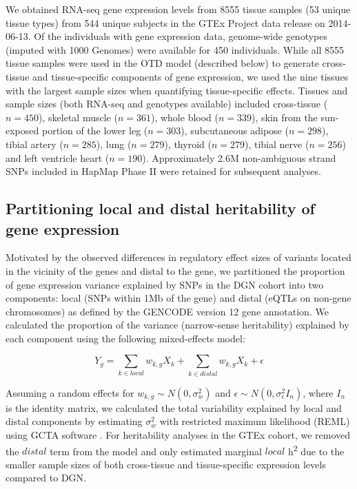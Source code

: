 \documentclass[10pt,letterpaper]{article}
\begin{document}
We obtained RNA-seq gene expression levels from 8555 tissue samples (53
unique tissue types) from 544 unique subjects in the GTEx Project \cite{Ardlie_2015} 
data release on 2014-06-13. Of the individuals with gene
expression data, genome-wide genotypes (imputed with 1000 Genomes) were
available for 450 individuals. While all 8555 tissue samples were used
in the OTD model (described below) to generate cross-tissue and
tissue-specific components of gene expression, we used the nine tissues
with the largest sample sizes when quantifying tissue-specific effects.
Tissues and sample sizes (both RNA-seq and genotypes available) included
cross-tissue (\(n=450\)), skeletal muscle (\(n=361\)), whole blood
(\(n=339\)), skin from the sun-exposed portion of the lower leg
(\(n=303\)), subcutaneous adipose (\(n=298\)), tibial artery
(\(n=285\)), lung (\(n=279\)), thyroid (\(n=279\)), tibial nerve
(\(n=256\)) and left ventricle heart (\(n=190\)). Approximately 2.6M
non-ambiguous strand SNPs included in HapMap Phase II were retained for
subsequent analyses.

\subsection*{Partitioning local and distal heritability of gene
expression}\label{partitioning-local-and-distal-heritability-of-gene-expression}

Motivated by the observed differences in regulatory effect sizes of variants located in the vicinity of the genes and distal to the gene,
we partitioned the proportion of gene expression variance explained by
SNPs in the DGN cohort into two components: local (SNPs within 1Mb of
the gene) and distal (eQTLs on non-gene chromosomes) as defined by the
GENCODE \cite{Harrow_2012} version 12 gene annotation. We calculated the
proportion of the variance (narrow-sense heritability) explained by each
component using the following mixed-effects model:

\[ Y_g = \sum_{k  \in local}w_{k,g} X_k + \sum_{k  \in distal}w_{k,g} X_k + \epsilon \]

Assuming a random effects for \(w_{k,g} \sim N(0, \sigma^2_w)\) and
\(\epsilon \sim N(0, \sigma^2_{\epsilon} I_n)\), where \(I_n\) is the
identity matrix, we calculated the total variability explained by local
and distal components by estimating \(\sigma^2_w\) with restricted
maximum likelihood (REML) using GCTA software \cite{Yang_2011}. For heritability
analyses in the GTEx cohort, we removed the \(distal\) term from the
model and only estimated marginal \(local\) h\textsuperscript{2} due to
the smaller sample sizes of both cross-tissue and tissue-specific
expression levels compared to DGN. 
\end{document}
